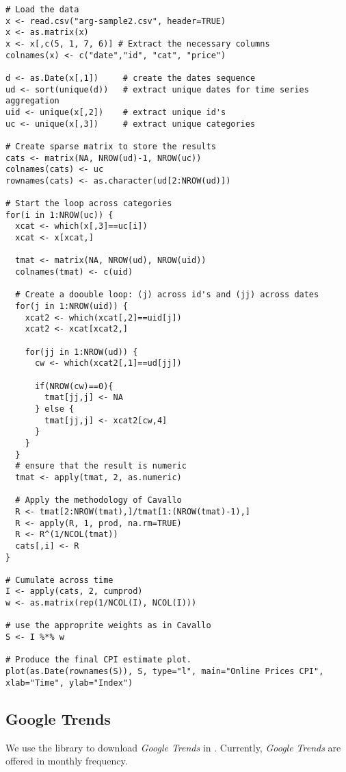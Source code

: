 \documentclass[12pt]{article}
\begin{document}
\begin{lstlisting}[title=\textbf{Web prices aggregation and plots.}]
# Load the data
x <- read.csv("arg-sample2.csv", header=TRUE)
x <- as.matrix(x)
x <- x[,c(5, 1, 7, 6)] # Extract the necessary columns
colnames(x) <- c("date","id", "cat", "price")

d <- as.Date(x[,1])		# create the dates sequence
ud <- sort(unique(d))	# extract unique dates for time series aggregation
uid <- unique(x[,2])	# extract unique id's
uc <- unique(x[,3])		# extract unique categories

# Create sparse matrix to store the results
cats <- matrix(NA, NROW(ud)-1, NROW(uc))
colnames(cats) <- uc
rownames(cats) <- as.character(ud[2:NROW(ud)])

# Start the loop across categories
for(i in 1:NROW(uc)) {
  xcat <- which(x[,3]==uc[i])
  xcat <- x[xcat,]

  tmat <- matrix(NA, NROW(ud), NROW(uid))
  colnames(tmat) <- c(uid)

  # Create a doouble loop: (j) across id's and (jj) across dates
  for(j in 1:NROW(uid)) {
    xcat2 <- which(xcat[,2]==uid[j])
    xcat2 <- xcat[xcat2,]

    for(jj in 1:NROW(ud)) {
      cw <- which(xcat2[,1]==ud[jj])

      if(NROW(cw)==0){
        tmat[jj,j] <- NA
      } else {
        tmat[jj,j] <- xcat2[cw,4]
      }
    }
  }
  # ensure that the result is numeric
  tmat <- apply(tmat, 2, as.numeric)

  # Apply the methodology of Cavallo
  R <- tmat[2:NROW(tmat),]/tmat[1:(NROW(tmat)-1),]
  R <- apply(R, 1, prod, na.rm=TRUE)
  R <- R^(1/NCOL(tmat))
  cats[,i] <- R
}

# Cumulate across time
I <- apply(cats, 2, cumprod)
w <- as.matrix(rep(1/NCOL(I), NCOL(I)))

# use the approprite weights as in Cavallo
S <- I %*% w

# Produce the final CPI estimate plot.
plot(as.Date(rownames(S)), S, type="l", main="Online Prices CPI", xlab="Time", ylab="Index")
\end{lstlisting}

\subsection{Google Trends \textendash{} {\href{https://github.com/eurostat/econowcast/blob/master/extract/Google.R}{}}}

We use the  library to download \emph{Google Trends} in .
Currently, \emph{Google Trends} are offered in monthly frequency.
\end{document}
